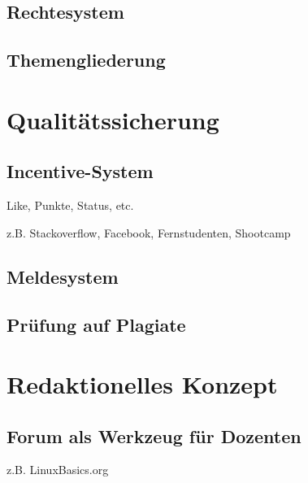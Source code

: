 \subsection{Rechtesystem} %
\label{sub:rechtesystem}


\subsection{Themengliederung} %
\label{sub:themengliederung}



\section{Qualitätssicherung} %
\label{sec:qualitatssicherung}

\subsection{Incentive-System} %
\label{sub:incentive_system}
Like, Punkte, Status, etc.

z.B. Stackoverflow, Facebook, Fernstudenten, Shootcamp

\subsection{Meldesystem} %
\label{sub:meldesystem}


\subsection{Prüfung auf Plagiate} %
\label{sub:prufung_auf_plagiate}



\section{Redaktionelles Konzept} %
\label{sec:redaktionelles_konzept}
\subsection{Forum als Werkzeug für Dozenten} %
\label{sub:forum_als_werkzeug_fur_dozenten}
z.B. LinuxBasics.org

